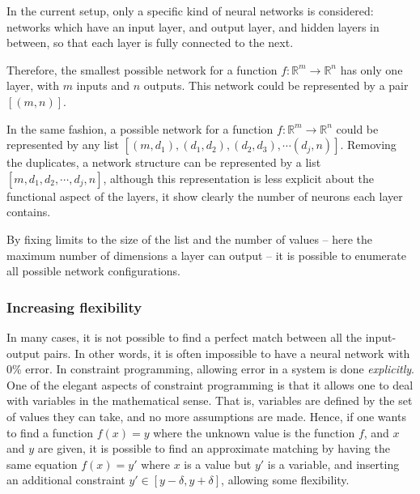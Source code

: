 \documentclass[a4paper, 10pt]{article}
\begin{document}
In the current setup, only a specific kind of neural networks is considered:
networks which have an input layer, and output layer, and hidden layers in
between, so that each layer is fully connected to the next.

Therefore, the smallest possible network for a function $f : \mathbb{R}^m
\rightarrow \mathbb{R}^n$ has only one layer, with $m$ inputs and $n$ outputs. 
This network could be represented by a pair $[(m,n)]$.

In the same fashion, a possible network for a function $f : \mathbb{R}^m \rightarrow
\mathbb{R}^n$ could be represented by any list $[(m, d_1),(d_1, d_2), (d_2,
d_3), \cdots (d_j, n)]$. Removing the duplicates, a network structure can be
represented by a list $[m, d_1, d_2, \cdots, d_j, n]$, although this
representation is less explicit about the functional aspect of the layers, it
show clearly the number of neurons each layer contains.

By fixing limits to the size of the list and the number of values -- here the
maximum number of dimensions a layer can output -- it is possible to enumerate
all possible network configurations.

\subsubsection*{Increasing flexibility}
In many cases, it is not possible to find a perfect match between all the
input-output pairs. In other words, it is often impossible to have a neural
network with 0\% error. In constraint programming, allowing error in a system is
done \emph{explicitly}. One of the elegant aspects of constraint programming is
that it allows one to deal with variables in the mathematical sense. That is,
variables are defined by the set of values they can take, and no more
assumptions are made. Hence, if one wants to find a function $f(x) = y$ where
the unknown value is the function $f$, and $x$ and $y$ are given, it is possible
to find an approximate matching by having the same equation $f(x) = y'$ where $x$
is a value but $y'$ is a variable, and inserting an additional constraint $y'
\in [y - \delta, y + \delta]$, allowing some flexibility. 

% 
% 
\end{document}
